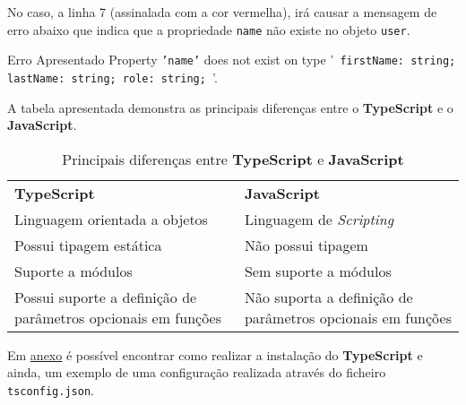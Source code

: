 No caso, a linha 7 (assinalada com a cor vermelha), irá causar a mensagem de erro abaixo que indica que a propriedade \texttt{name} não existe no objeto \texttt{user}.

\begin{errorbox}{Erro Apresentado}
	Property \texttt{'name'} does not exist on type '\texttt{{ firstName: string; lastName: string; role: string; }}'.
\end{errorbox}

A tabela apresentada demonstra as principais diferenças entre o \textbf{TypeScript} e o \textbf{JavaScript}.

\begin{table}[h!]
	\renewcommand{\arraystretch}{1.25}
	\begin{tabularx}{\textwidth}{ |X|X| }
		\rowcolor{estg}	{\color[HTML]{FFFFFF} \textbf{TypeScript}} & {\color[HTML]{FFFFFF} \textbf{JavaScript}} \\
		Linguagem orientada a objetos & Linguagem de \textit{Scripting} \\\hline
		Possui tipagem estática & Não possui tipagem \\\hline
		Suporte a módulos & Sem suporte a módulos\\\hline
		Possui suporte a definição de parâmetros opcionais em funções & Não suporta a definição de parâmetros opcionais em funções \\\hline
	\end{tabularx}

	\caption{Principais diferenças entre \textbf{TypeScript} e \textbf{JavaScript}}
\end{table}

Em \underline{\hyperref[typescriptAttachment]{anexo}} é possível encontrar como realizar a instalação do \textbf{TypeScript} e ainda, um exemplo de uma configuração realizada através do ficheiro \texttt{tsconfig.json}.